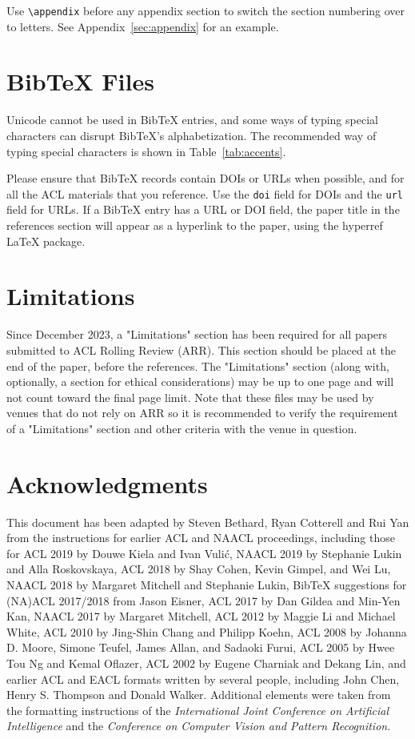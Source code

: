 \documentclass[11pt]{article}
\begin{document}
Use \verb|\appendix| before any appendix section to switch the section numbering over to letters. See Appendix~\ref{sec:appendix} for an example.

\section{Bib\TeX{} Files}
\label{sec:bibtex}

Unicode cannot be used in Bib\TeX{} entries, and some ways of typing special characters can disrupt Bib\TeX's alphabetization. The recommended way of typing special characters is shown in Table~\ref{tab:accents}.

Please ensure that Bib\TeX{} records contain DOIs or URLs when possible, and for all the ACL materials that you reference.
Use the \verb|doi| field for DOIs and the \verb|url| field for URLs.
If a Bib\TeX{} entry has a URL or DOI field, the paper title in the references section will appear as a hyperlink to the paper, using the hyperref \LaTeX{} package.

\section*{Limitations}

Since December 2023, a "Limitations" section has been required for all papers submitted to ACL Rolling Review (ARR). This section should be placed at the end of the paper, before the references. The "Limitations" section (along with, optionally, a section for ethical considerations) may be up to one page and will not count toward the final page limit. Note that these files may be used by venues that do not rely on ARR so it is recommended to verify the requirement of a "Limitations" section and other criteria with the venue in question.

\section*{Acknowledgments}

This document has been adapted
by Steven Bethard, Ryan Cotterell and Rui Yan
from the instructions for earlier ACL and NAACL proceedings, including those for
ACL 2019 by Douwe Kiela and Ivan Vuli\'{c},
NAACL 2019 by Stephanie Lukin and Alla Roskovskaya,
ACL 2018 by Shay Cohen, Kevin Gimpel, and Wei Lu,
NAACL 2018 by Margaret Mitchell and Stephanie Lukin,
Bib\TeX{} suggestions for (NA)ACL 2017/2018 from Jason Eisner,
ACL 2017 by Dan Gildea and Min-Yen Kan,
NAACL 2017 by Margaret Mitchell,
ACL 2012 by Maggie Li and Michael White,
ACL 2010 by Jing-Shin Chang and Philipp Koehn,
ACL 2008 by Johanna D. Moore, Simone Teufel, James Allan, and Sadaoki Furui,
ACL 2005 by Hwee Tou Ng and Kemal Oflazer,
ACL 2002 by Eugene Charniak and Dekang Lin,
and earlier ACL and EACL formats written by several people, including
John Chen, Henry S. Thompson and Donald Walker.
Additional elements were taken from the formatting instructions of the \emph{International Joint Conference on Artificial Intelligence} and the \emph{Conference on Computer Vision and Pattern Recognition}.
\end{document}
